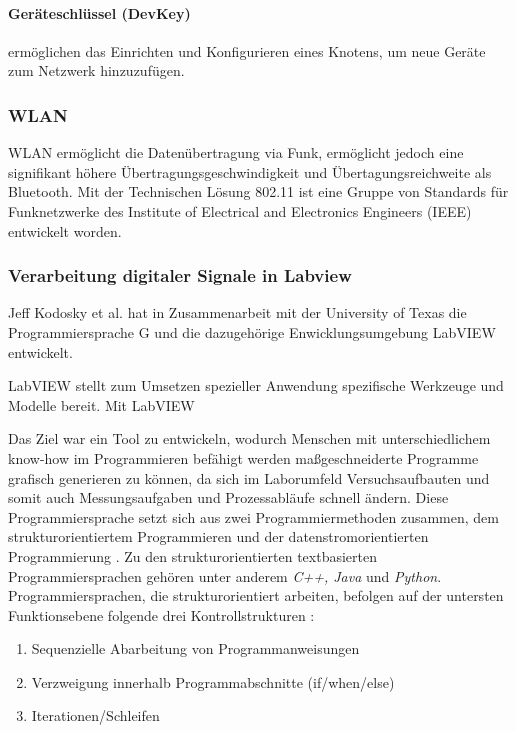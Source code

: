 \paragraph{Geräteschlüssel (DevKey)} ermöglichen das Einrichten und Konfigurieren eines Knotens, um neue Geräte zum Netzwerk hinzuzufügen.

\subsubsection{WLAN}

WLAN ermöglicht die Datenübertragung via Funk, ermöglicht jedoch eine signifikant höhere Übertragungsgeschwindigkeit und Übertagungsreichweite als Bluetooth. Mit der Technischen Lösung 802.11 ist eine Gruppe von Standards für Funknetzwerke des Institute of Electrical and Electronics Engineers (IEEE) entwickelt worden. 

\subsubsection{Verarbeitung digitaler Signale in Labview}

Jeff Kodosky et al. hat in Zusammenarbeit mit der University of Texas die Programmiersprache G und die dazugehörige Enwicklungsumgebung LabVIEW entwickelt. 

LabVIEW stellt zum Umsetzen spezieller Anwendung spezifische Werkzeuge und Modelle bereit. Mit LabVIEW 

Das Ziel war ein Tool zu entwickeln, wodurch Menschen mit unterschiedlichem know-how im Programmieren befähigt werden maßgeschneiderte Programme grafisch generieren zu können, da sich im Laborumfeld Versuchsaufbauten und somit auch Messungsaufgaben und Prozessabläufe schnell ändern. Diese Programmiersprache setzt sich aus zwei Programmiermethoden zusammen, dem strukturorientiertem Programmieren und der datenstromorientierten Programmierung  \cite{kodosky}. Zu den strukturorientierten textbasierten Programmiersprachen gehören unter anderem \textit{C++, Java} und \textit{Python}. Programmiersprachen, die strukturorientiert arbeiten, befolgen auf der untersten Funktionsebene folgende drei Kontrollstrukturen \cite{structured}:

\begin{enumerate}
\item Sequenzielle Abarbeitung von Programmanweisungen
\item Verzweigung innerhalb Programmabschnitte (if/when/else)
\item Iterationen/Schleifen
\end{enumerate} 

